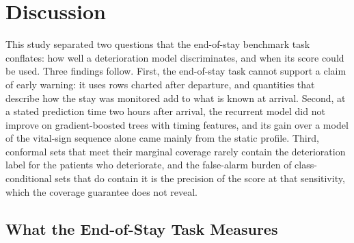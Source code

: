 \section{Discussion}
\label{sec:discussion}

This study separated two questions that the end-of-stay benchmark task conflates: how well a deterioration model discriminates, and when its score could be used.
Three findings follow. First, the end-of-stay task cannot support a claim of early warning: it uses rows charted after departure, and quantities that describe how the stay was monitored add to what is
known at arrival. Second, at a stated prediction time two hours after arrival, the recurrent model did not improve on gradient-boosted trees with timing features, and its
gain over a model of the vital-sign sequence alone came mainly from the static profile. Third, conformal sets that meet their marginal coverage rarely contain the
deterioration label for the patients who deteriorate, and the false-alarm burden of class-conditional sets that do contain it is the precision of the score at that sensitivity, which the coverage guarantee does not reveal.

\subsection{What the End-of-Stay Task Measures}

